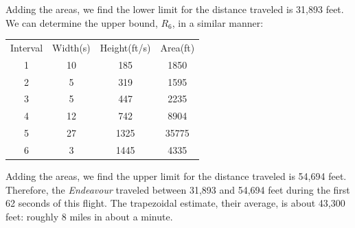 Adding the areas, we find the lower limit for the distance traveled is 31,893 feet. We can determine the upper bound, $R_6$, in a similar manner:
\begin{center}
	\begin{tabular}{c|c|c|c}
		Interval & Width(s) & Height(ft/s) & Area(ft) \\
		1        & 10       & 185          & 1850     \\
		2        & 5        & 319          & 1595     \\
		3        & 5        & 447          & 2235     \\
		4        & 12       & 742          & 8904     \\
		5        & 27       & 1325         & 35775    \\
		6        & 3        & 1445         & 4335     \\
	\end{tabular}
\end{center}
Adding the areas, we find the upper limit for the distance traveled is 54,694 feet. Therefore, the \textit{Endeavour} traveled between 31,893 and 54,694 feet during the first 62 seconds of this flight. The trapezoidal estimate, their average, is about 43,300 feet: roughly 8 miles in about a minute.
